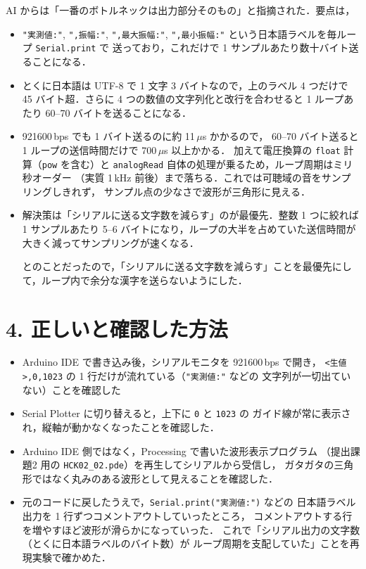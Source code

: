 \documentclass[a4paper,11pt,dvipdfmx]{jsarticle}
\begin{document}
AI からは「一番のボトルネックは出力部分そのもの」と指摘された．要点は，
\begin{itemize}
  \item \texttt{"実測値:"}, \texttt{",振幅:"}, \texttt{",最大振幅:"},
        \texttt{",最小振幅:"} という日本語ラベルを毎ループ \texttt{Serial.print} で
        送っており，これだけで 1 サンプルあたり数十バイト送ることになる．
  \item とくに日本語は UTF-8 で 1 文字 3 バイトなので，上のラベル 4 つだけで
        45 バイト超．さらに 4 つの数値の文字列化と改行を合わせると
        1 ループあたり 60--70 バイトを送ることになる．
  \item 921600\,bps でも 1 バイト送るのに約 11\,$\mu$s かかるので，
        60--70 バイト送ると 1 ループの送信時間だけで 700\,$\mu$s 以上かかる．
        加えて電圧換算の \texttt{float} 計算（\texttt{pow} を含む）と
        \texttt{analogRead} 自体の処理が乗るため，ループ周期はミリ秒オーダー
        （実質 1\,kHz 前後）まで落ちる．これでは可聴域の音をサンプリングしきれず，
        サンプル点の少なさで波形が三角形に見える．
  \item 解決策は「シリアルに送る文字数を減らす」のが最優先．整数 1 つに絞れば
        1 サンプルあたり 5--6 バイトになり，ループの大半を占めていた送信時間が
        大きく減ってサンプリングが速くなる．

        とのことだったので，「シリアルに送る文字数を減らす」ことを最優先にして，ループ内で余分な漢字を送らないようにした．
\end{itemize}

\section*{4. 正しいと確認した方法}
\begin{itemize}
  \item Arduino IDE で書き込み後，シリアルモニタを 921600\,bps で開き，
        \texttt{<生値>,0,1023} の 1 行だけが流れている（\texttt{"実測値:"} などの
        文字列が一切出ていない）ことを確認した
  \item Serial Plotter に切り替えると，上下に \texttt{0} と \texttt{1023} の
        ガイド線が常に表示され，縦軸が動かなくなったことを確認した．
  \item Arduino IDE 側ではなく，Processing で書いた波形表示プログラム
        （提出課題2 用の \texttt{HCK02\_02.pde}）を再生してシリアルから受信し，
        ガタガタの三角形ではなく丸みのある波形として見えることを確認した．
  \item 元のコードに戻したうえで，\texttt{Serial.print("実測値:")} などの
        日本語ラベル出力を 1 行ずつコメントアウトしていったところ，
        コメントアウトする行を増やすほど波形が滑らかになっていった．
        これで「シリアル出力の文字数（とくに日本語ラベルのバイト数）が
        ループ周期を支配していた」ことを再現実験で確かめた．
\end{itemize}
\end{document}
